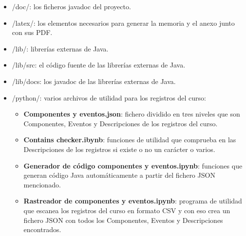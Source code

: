\begin{itemize}
	\item /doc/: los ficheros javadoc del proyecto.
	\item /latex/: los elementos necesarios para generar la memoria y el anexo junto con sus PDF.
	\item /lib/: librerías externas de Java.
	\item /lib/src: el código fuente de las librerías externas de Java.
	\item /lib/docs: los javadoc de las librerías externas de Java.
	\item /python/: varios archivos de utilidad para los registros del curso:
	\begin{itemize}
		\item \textbf{Componentes y eventos.json}: fichero dividido en tres niveles que son Componentes, Eventos y Descripciones de los registros del curso.
		\item \textbf{Contains checker.ibynb}: funciones de utilidad que comprueba en las Descripciones de los registros si existe o no un carácter o varios.
		\item \textbf{Generador de código componentes y eventos.ipynb}: funciones que generan código Java automáticamente a partir del fichero JSON mencionado.
		\item \textbf{Rastreador de componentes y eventos.ipynb}: programa de utilidad que escanea los registros del curso en formato CSV y con eso crea un fichero JSON con todos los Componentes, Eventos y Descripciones encontrados.
	\end{itemize}


\end{itemize}
